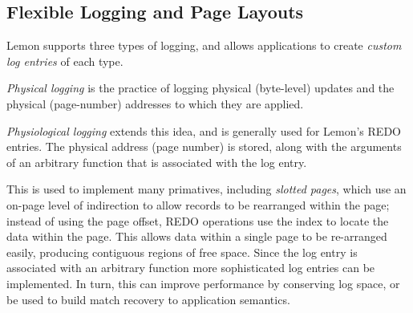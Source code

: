 \documentclass[10pt,letterpaper,twocolumn,english]{article}
\newcommand{\yad}{Lemon\xspace}
\begin{document}

%


\subsection{Flexible Logging and Page Layouts}
\label{flex-logging}
\label{page-layouts}

\yad supports three types of logging, and allows applications to create
{\em custom log entries} of each type.

{\em Physical logging } 
is the practice of logging physical (byte-level) updates
and the physical (page-number) addresses to which they are applied.

{\em Physiological logging } extends this idea, and is generally used 
for \yad's REDO entries.  The physical address (page number) is
stored, along with the arguments of an arbitrary function that 
is associated with the log entry.

This is used to implement many primatives, including {\em slotted pages}, which use
an on-page level of indirection to allow records to be rearranged
within the page; instead of using the page offset, REDO operations use
the index to locate the data within the page. This allows data within a single
page to be re-arranged easily, producing contiguous regions of
free space.  Since the log entry is associated with an arbitrary function
more sophisticated log entries can be implemented.  In turn, this can improve 
performance by conserving log space, or be used to build match recovery to application
semantics.
\end{document}
